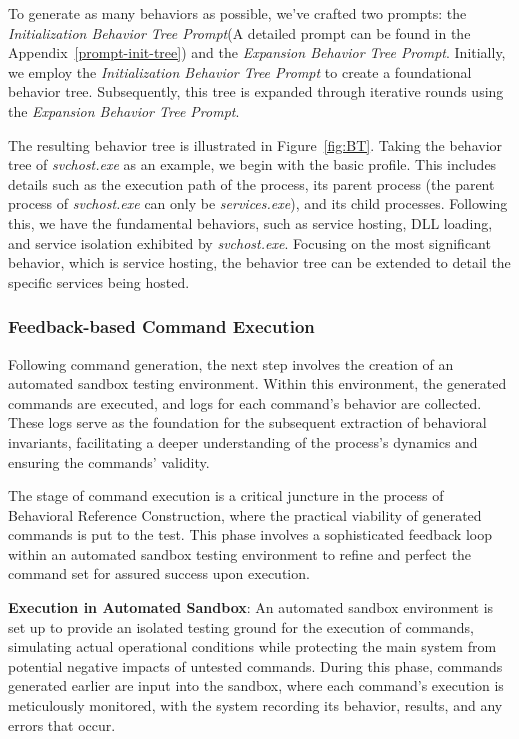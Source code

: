 To generate as many behaviors as possible, we've crafted two prompts: the \textit{Initialization Behavior Tree Prompt}(A detailed prompt can be found in the Appendix~\ref{prompt-init-tree}) and the \textit{Expansion Behavior Tree Prompt}. Initially, we employ the \textit{Initialization Behavior Tree Prompt} to create a foundational behavior tree. Subsequently, this tree is expanded through iterative rounds using the \textit{Expansion Behavior Tree Prompt}.

The resulting behavior tree is illustrated in Figure~\ref{fig:BT}. Taking the behavior tree of \textit{svchost.exe} as an example, we begin with the basic profile. This includes details such as the execution path of the process, its parent process (the parent process of \textit{svchost.exe} can only be \textit{services.exe}), and its child processes. Following this, we have the fundamental behaviors, such as service hosting, DLL loading, and service isolation exhibited by \textit{svchost.exe}. Focusing on the most significant behavior, which is service hosting, the behavior tree can be extended to detail the specific services being hosted. 

\subsubsection{Feedback-based Command Execution}
Following command generation, the next step involves the creation of an automated sandbox testing environment. Within this environment, the generated commands are executed, and logs for each command's behavior are collected. These logs serve as the foundation for the subsequent extraction of behavioral invariants, facilitating a deeper understanding of the process's dynamics and ensuring the commands' validity.

The stage of command execution is a critical juncture in the process of Behavioral Reference Construction, where the practical viability of generated commands is put to the test. This phase involves a sophisticated feedback loop within an automated sandbox testing environment to refine and perfect the command set for assured success upon execution.

\noindent
{\bf Execution in Automated Sandbox}:
An automated sandbox environment is set up to provide an isolated testing ground for the execution of commands, simulating actual operational conditions while protecting the main system from potential negative impacts of untested commands. During this phase, commands generated earlier are input into the sandbox, where each command's execution is meticulously monitored, with the system recording its behavior, results, and any errors that occur.

